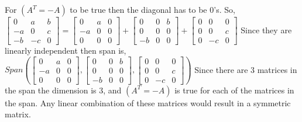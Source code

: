 	For $(A^T = -A)$ to be true then the diagonal has to be 0's. So,
				\newline
				$
				\begin{bmatrix}
				0 & a & b \\
				-a & 0 & c \\
				-b & -c & 0
				\end{bmatrix}
				=
				\begin{bmatrix}
				0 & a & 0 \\
				-a & 0 & 0 \\
				0 & 0 & 0
				\end{bmatrix}
				+
				\begin{bmatrix}
				0 & 0 & b \\
				0 & 0 & 0 \\
				-b & 0 & 0
				\end{bmatrix}
				+
				\begin{bmatrix}
				0 & 0 & 0 \\
				0 & 0 & c \\
				0 & -c & 0
				\end{bmatrix}
				$
				Since they are linearly independent then span is, 
				\newline
				$
				Span \left(
				\begin{bmatrix}
				0 & a & 0 \\
				-a & 0 & 0 \\
				0 & 0 & 0
				\end{bmatrix}
				,
				\begin{bmatrix}
				0 & 0 & b \\
				0 & 0 & 0 \\
				-b & 0 & 0
				\end{bmatrix}
				,
				\begin{bmatrix}
				0 & 0 & 0 \\
				0 & 0 & c \\
				0 & -c & 0
				\end{bmatrix}
				\right)
				$
				Since there are 3 matrices in the span the dimension is 3, and $(A^T = -A)$ is true for each of the matrices in the span. Any linear combination of these matrices would result in a symmetric matrix.